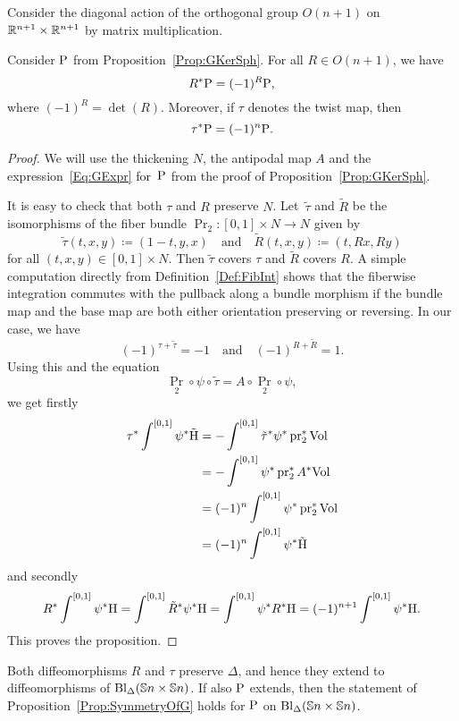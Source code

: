 \documentclass[\MainFolder/Text.tex]{subfiles}
\begin{document}
Consider the diagonal action of the orthogonal group $O(n+1)$ on $\mathbb{R}^{n+1}\times\mathbb{R}^{n+1}$ by matrix multiplication.
\begin{Proposition}\label{Prop:SymmetryOfG}
Consider $\mathrm{P}$ from Proposition~\ref{Prop:GKerSph}. For all $R\in O(n+1)$, we have
\[ R^* \mathrm{P} = (-1)^R \mathrm{P}, \]
where $(-1)^R = \det(R)$. Moreover, if $\tau$ denotes the twist map, then
\[\tau^*\mathrm{P} = (-1)^{n}\mathrm{P}. \] 
\end{Proposition}
%
\begin{proof} %
We will use the thickening $N$, the antipodal map $A$ and the expression~\eqref{Eq:GExpr} for~$\mathrm{P}$ from the proof of Proposition~\ref{Prop:GKerSph}.

It is easy to check that both $\tau$ and $R$ preserve $N$. Let~$\tilde{\tau}$ and $\tilde{R}$ be the isomorphisms of the fiber bundle $\Pr_2: [0,1]\times N \rightarrow N$ given by 
\[ \tilde{\tau}(t,x,y) \coloneqq (1-t,y,x)\quad \text{and}\quad \tilde{R}(t,x,y) \coloneqq (t,Rx,Ry) \]
for all $(t,x,y)\in [0,1]\times N$. Then $\tilde{\tau}$ covers $\tau$ and $\tilde{R}$ covers $R$. A simple computation directly from Definition~\ref{Def:FibInt} shows that the fiberwise integration commutes with the pullback along a bundle morphism if the bundle map and the base map are both either orientation preserving or reversing. In our case, we have 
\[ (-1)^{\tau + \tilde{\tau}} = -1\quad \text{and}\quad (-1)^{R+\tilde{R}} = 1. \]
Using this and the equation
\[ \Pr_2 \circ \psi \circ \tilde{\tau} = A\circ \Pr_2 \circ \psi, \]
we get firstly
\allowdisplaybreaks
\begin{align*}
\tau^* \int^{[0,1]} \psi^*\tilde{\mathrm{H}} &=  - \int^{[0,1]} \tilde{\tau}^* \psi^*\operatorname{\mathrm{pr}}_2^*\mathrm{Vol} \\ &= - \int^{[0,1]} \psi^*\operatorname{\mathrm{pr}}_2^*A^* \mathrm{Vol} \\ &= (-1)^n \int^{[0,1]} \psi^*\operatorname{\mathrm{pr}}_2^*\mathrm{Vol} \\ & = (-1)^n \int^{[0,1]} \psi^*\tilde{\mathrm{H}}
\end{align*}
and secondly
\[ R^* \int^{[0,1]} \psi^* \mathrm{H} = \int^{[0,1]} \tilde{R}^* \psi^* \mathrm{H} = \int^{[0,1]} \psi^* R^*\mathrm{H} = (-1)^{n+1} \int^{[0,1]} \psi^* \mathrm{H}. \]
This proves the proposition.
\end{proof}
Both diffeomorphisms $R$ and $\tau$ preserve $\Delta$, and hence they extend to diffeomorphisms of $\mathrm{Bl}_\Delta(\mathbb{S}{n}\times\mathbb{S}{n})$. If also $\mathrm{P}$ extends, then the statement of Proposition~\ref{Prop:SymmetryOfG} holds for $\mathrm{P}$ on $\mathrm{Bl}_\Delta(\mathbb{S}{n}\times\mathbb{S}{n})$.
\end{document}
